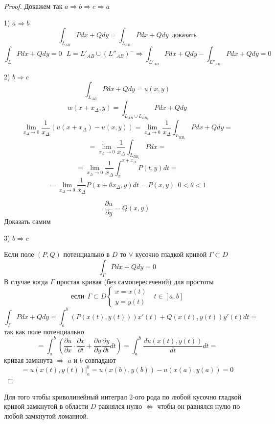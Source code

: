\begin{proof}
  Докажем так $a \Rightarrow b \Rightarrow c \Rightarrow a$

  1) $a \Rightarrow b$
  $$
  \int_{L_{AB}} Pdx + Qdy = \int_{L_{AB}} Pdx + Qdy ~~ \text{доказать}
  $$
  $$
  \int_L Pdx + Qdy = 0 ~~~ L = L'_{AB} \cup (L''_{AB})^- \Rightarrow
  \int_{L'_{AB}} Pdx + Qdy - \int_{L''_{AB}} Pdx + Qdy = 0
  $$

  2) $b \Rightarrow c$
  $$
  \int_{L_{AB}} Pdx + Qdy = u(x,y)
  $$
  $$
  w(x + x_{\Delta}, y) = \int_{L_{AB} \cup L_{BB_1}} Pdx + Qdy
  $$
  $$
  \lim_{x_{\Delta} \to 0} \frac{1}{x_{\Delta}} (u(x + x_{\Delta}) - u(x,y))
  = \lim_{x_{\Delta} \to 0} \frac{1}{x_{\Delta}} \int_{L_{BB_1}} Pdx + Qdy =
  $$
  $$
  = \lim_{x_{\Delta} \to 0} \frac{1}{x_{\Delta}} \int_{L_{BB_1}} Pdx =
  $$
  $$
  = \lim_{x_{\Delta} \to 0} \frac{1}{x_{\Delta}} \int_x^{x+x_{\Delta}}
  P(t, y)dt =
  $$
  $$
  = \lim_{x_{\Delta} \to 0} \frac{1}{x_{\Delta}} P(x + \theta x_{\Delta}, y)dt
  = P(x,y) ~~ 0 < \theta < 1
  $$

  $$
  \frac{\partial u}{\partial y} = Q(x,y)
  $$
  Доказать самим

  3) $b \Rightarrow c$

  Если поле $(P, Q)$ потенциально в $D$ то $\forall$ кусочно гладкой кривой
  $\Gamma \subset D$
  $$
  \int_{\Gamma} P dx + Q dy = 0
  $$
  В случае когда $\Gamma$ простая кривая (без самопересечений) для простоты
  $$
  \text{если} ~~ \Gamma \subset D
  \left\{
  \begin{array}{l}
    x = x(t) \\
    y = y(t)
  \end{array}
  \right.
  ~~~ t \in [a,b]
  $$
  $$
  \int_{\Gamma} Pdx + Qdy = \int_a^b (P(x(t), y(t)))x'(t) +
  Q(x(t), y(t))y'(t)dt =
  $$
  так как поле потенциально
  $$
  = \int_a^b \left( \frac{\partial u}{\partial x} \cdot
  \frac{\partial x}{\partial t} + \frac{\partial u}{\partial y}
  \frac{\partial y}{\partial t} dt \right) = \int_a^b
  \frac{du(x(t), y(t))}{dt} dt =
  $$
  кривая замкнута $\Rightarrow$ $a$ и $b$ совпадают
  $$
  = u(x(t), y(t))|_a^b = u(x(b), y(b)) - u(x(a), y(a)) = 0
  $$
\end{proof}

\begin{block}[Следствие]
  Для того чтобы криволинейный интеграл 2-ого рода по любой кусочно гладкой
  кривой замкнутой в области $D$ равнялся нулю $\Leftrightarrow$ чтобы он
  равнялся нулю по любой замкнутой ломанной.
\end{block}

